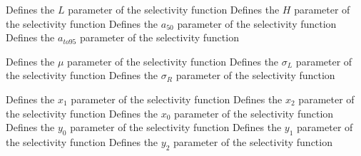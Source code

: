  {Defines the $L$ parameter of the selectivity function}
 {Defines the $H$ parameter of the selectivity function}
 {Defines the $a_{50}$ parameter of the selectivity function}
 {Defines the $a_{to95}$ parameter of the selectivity function}
\par\textbf{}\par
{} {Defines the $\mu$ parameter of the selectivity function}
 {Defines the $\sigma_L$ parameter of the selectivity function}
 {Defines the $\sigma_R$ parameter of the selectivity function}
\par\textbf{}\par
{} {Defines the $x_1$ parameter of the selectivity function}
 {Defines the $x_2$ parameter of the selectivity function}
 {Defines the $x_0$ parameter of the selectivity function}
 {Defines the $y_0$ parameter of the selectivity function}
 {Defines the $y_1$ parameter of the selectivity function}
 {Defines the $y_2$ parameter of the selectivity function}
